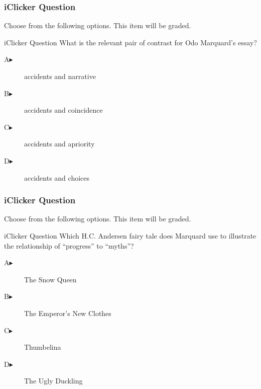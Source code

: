 \documentclass[xcolor=dvipsnames]{beamer}
\begin{document}
\begin{frame}
  \frametitle{iClicker Question}
Choose from the following options. This item will be graded.
\begin{block}{iClicker Question}
What is the relevant pair of contrast for Odo Marquard's essay?
\end{block}
\begin{description}
\item[A\hspace{.2in}$\blacktriangleright$] accidents and narrative
\item[B\hspace{.2in}$\blacktriangleright$] accidents and coincidence
\item[C\hspace{.2in}$\blacktriangleright$] accidents and apriority
\item[D\hspace{.2in}$\blacktriangleright$] accidents and choices
\end{description}
\end{frame}

\begin{frame}
  \frametitle{iClicker Question}
Choose from the following options. This item will be graded.
\begin{block}{iClicker Question}
Which H.C. Andersen fairy tale does Marquard use to illustrate the
relationship of ``progress'' to ``myths''?
\end{block}
\begin{description}
\item[A\hspace{.2in}$\blacktriangleright$] The Snow Queen
\item[B\hspace{.2in}$\blacktriangleright$] The Emperor's New Clothes
\item[C\hspace{.2in}$\blacktriangleright$] Thumbelina
\item[D\hspace{.2in}$\blacktriangleright$] The Ugly Duckling
\end{description}
\end{frame}
\end{document}
